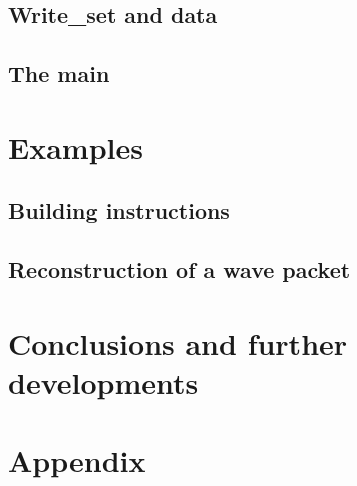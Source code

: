 \documentclass[12pt, a4paper]{report}
\theoremstyle{definition}
\begin{document}
\section{Write\_set and data}
\section{The main}



\chapter{Examples}\label{chapter4}

\section{Building instructions}
\section{Reconstruction of a wave packet}



\chapter*{Conclusions and further developments}




\appendix
\chapter*{Appendix}\label{appendix}


\end{document}
